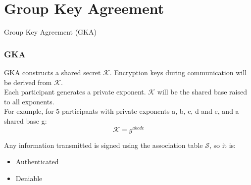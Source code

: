 \section{Group Key Agreement}

\begin{frame}
\Huge{\centerline{Group Key Agreement (GKA)}}
\end{frame}

\begin{frame}
  \frametitle{GKA}
  GKA constructs a shared secret $\mathcal{K}$. Encryption keys during communication will be derived from $\mathcal{K}$.\\[0.3cm]

  Each participant generates a private exponent.  $\mathcal{K}$ will be the shared base raised to all exponents.\\[0.3cm]

  For example, for 5 participants with private exponents a, b, c, d and e, and a shared base g:
  \[ \mathcal{K} = g^{abcde} \]

  Any information transmitted is signed using the association table $\mathcal{S}$, so it is:
  \begin{itemize}
    \item Authenticated
    \item Deniable
  \end{itemize}

\end{frame}

